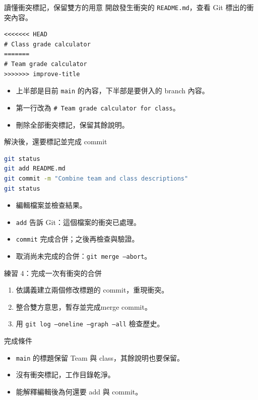 \documentclass[xetex, unicode, 10pt, aspectratio=169]{beamer}
\begin{document}
\begin{frame}[fragile]{讀懂衝突標記，保留雙方的用意}
    開啟發生衝突的 \texttt{README.md}，查看 Git 標出的衝突內容。
\begin{lstlisting}
<<<<<<< HEAD
# Class grade calculator
=======
# Team grade calculator
>>>>>>> improve-title
\end{lstlisting}
    \begin{itemize}
        \item 上半部是目前 \texttt{main} 的內容，下半部是要併入的 branch 內容。
        \item 第一行改為 \texttt{\# Team grade calculator for class}。
        \item 刪除全部衝突標記，保留其餘說明。
    \end{itemize}
\end{frame}

\begin{frame}[fragile]{解決後，還要標記並完成 commit}
\begin{lstlisting}[language=bash]
git status
git add README.md
git commit -m "Combine team and class descriptions"
git status
\end{lstlisting}
    \begin{itemize}
        \item 編輯檔案並檢查結果。
        \item \texttt{add} 告訴 Git：這個檔案的衝突已處理。
        \item \texttt{commit} 完成合併；之後再檢查與驗證。
        \item 取消尚未完成的合併：\texttt{git merge --abort}。
    \end{itemize}
\end{frame}

\begin{frame}{練習 4：完成一次有衝突的合併}
    \begin{enumerate}
        \item 依講義建立兩個修改標題的 commit，重現衝突。
        \item 整合雙方意思，暫存並完成merge commit。
        \item 用 \texttt{git log --oneline --graph --all} 檢查歷史。
    \end{enumerate}
    \begin{block}{完成條件}
        \begin{itemize}
            \item \texttt{main} 的標題保留 Team 與 class，其餘說明也要保留。
            \item 沒有衝突標記，工作目錄乾淨。
            \item 能解釋編輯後為何還要 add 與 commit。
        \end{itemize}
    \end{block}
\end{frame}
\end{document}
